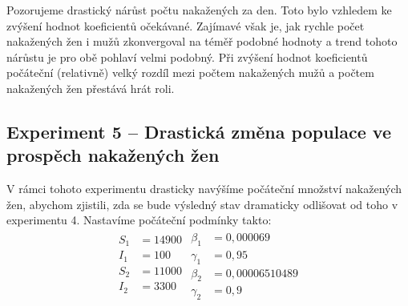 \documentclass{article}
\begin{document}
Pozorujeme drastický nárůst počtu nakažených za den. Toto bylo vzhledem ke zvýšení hodnot koeficientů očekávané. Zajímavé však je, jak rychle počet nakažených žen i mužů zkonvergoval na téměř podobné hodnoty a trend tohoto nárůstu je pro obě pohlaví velmi podobný. Při zvýšení hodnot koeficientů počáteční (relativně) velký rozdíl mezi počtem nakažených mužů a počtem nakažených žen přestává hrát roli.
\newpage

\subsection{Experiment 5 -- Drastická změna populace ve prospěch nakažených žen}
V rámci tohoto experimentu drasticky navýšíme počáteční množství nakažených žen, abychom zjistili, zda se bude výsledný stav dramaticky odlišovat od toho v experimentu 4. Nastavíme počáteční podmínky takto:
\begin{align}
\begin{split}
    S_1&=14900\\
    I_1&=100\\
    S_2&=11000\\
    I_2&=3300\\
\end{split}
\begin{split}
    \beta_1&=0,000069\\
    \gamma_1&=0,95\\
    \beta_2&=0,00006510489\\
    \gamma_2&=0,9\nonumber
\end{split}
\end{align}
\end{document}
